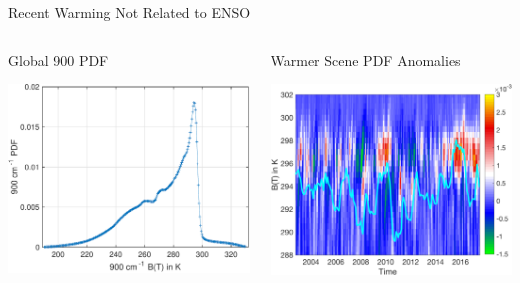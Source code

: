 \documentclass[10pt,t]{beamer}
\begin{document}
\begin{frame}{Recent Warming Not Related to ENSO}

  \begin{columns}
    \begin{column}[T]{0.50\textwidth}
      \vspace{-0.2in}
      \begin{block}{\footnotesize Global 900 \wn PDF}
        \vspace{-0.1in}
        \begin{center}
          \includegraphics[width=0.80\linewidth]{./Figs_mei/Pdf/bt900_pdf_mean_in_time.pdf}
        \end{center}
      \end{block}
    \end{column}

    \begin{column}[T]{0.50\textwidth}
        \vspace{-0.2in}
      \begin{block}{\footnotesize Warmer Scene PDF Anomalies}
        \vspace{-0.1in}
        \begin{center}
          \includegraphics[width=0.80\linewidth]{./Figs_mei/Png/bt900_pdf_anom_highT_with_mei_index.png}
        \end{center}
      \end{block}
    \end{column}
  \end{columns}


\end{frame}
\end{document}
